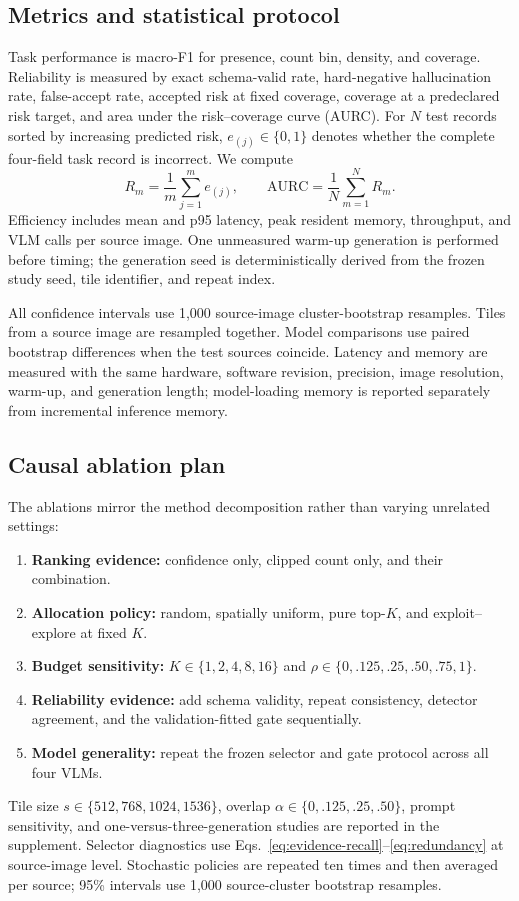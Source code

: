 \subsection{Metrics and statistical protocol}
Task performance is macro-F1 for presence, count bin, density, and coverage. Reliability is measured by exact schema-valid rate, hard-negative hallucination rate, false-accept rate, accepted risk at fixed coverage, coverage at a predeclared risk target, and area under the risk--coverage curve (AURC). For $N$ test records sorted by increasing predicted risk, $e_{(j)}\in\{0,1\}$ denotes whether the complete four-field task record is incorrect. We compute
\begin{equation}
R_m=\frac{1}{m}\sum_{j=1}^{m}e_{(j)},\qquad
\mathrm{AURC}=\frac{1}{N}\sum_{m=1}^{N}R_m.
\label{eq:aurc}
\end{equation}
Efficiency includes mean and p95 latency, peak resident memory, throughput, and VLM calls per source image. One unmeasured warm-up generation is performed before timing; the generation seed is deterministically derived from the frozen study seed, tile identifier, and repeat index.

All confidence intervals use 1,000 source-image cluster-bootstrap resamples. Tiles from a source image are resampled together. Model comparisons use paired bootstrap differences when the test sources coincide. Latency and memory are measured with the same hardware, software revision, precision, image resolution, warm-up, and generation length; model-loading memory is reported separately from incremental inference memory.

\subsection{Causal ablation plan}
The ablations mirror the method decomposition rather than varying unrelated settings:
\begin{enumerate}[leftmargin=*,nosep]
    \item \textbf{Ranking evidence:} confidence only, clipped count only, and their combination.
    \item \textbf{Allocation policy:} random, spatially uniform, pure top-$K$, and exploit--explore at fixed $K$.
    \item \textbf{Budget sensitivity:} $K\in\{1,2,4,8,16\}$ and $\rho\in\{0,.125,.25,.50,.75,1\}$.
    \item \textbf{Reliability evidence:} add schema validity, repeat consistency, detector agreement, and the validation-fitted gate sequentially.
    \item \textbf{Model generality:} repeat the frozen selector and gate protocol across all four VLMs.
\end{enumerate}
Tile size $s\in\{512,768,1024,1536\}$, overlap $\alpha\in\{0,.125,.25,.50\}$, prompt sensitivity, and one-versus-three-generation studies are reported in the supplement. Selector diagnostics use Eqs.~\eqref{eq:evidence-recall}--\eqref{eq:redundancy} at source-image level. Stochastic policies are repeated ten times and then averaged per source; 95\% intervals use 1,000 source-cluster bootstrap resamples.
